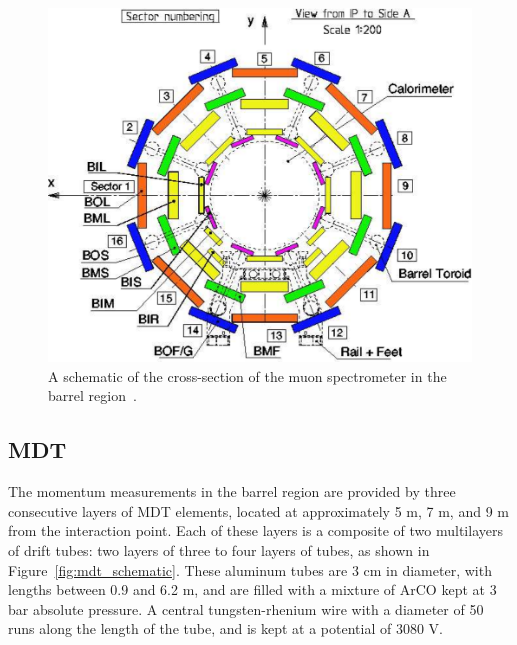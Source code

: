 \begin{figure}[hbtp]
\includegraphics[width=\fullfig]{figures/muon_barrel_schematic.pdf}
\caption{A schematic of the cross-section of the muon spectrometer in the barrel region~\cite{atlas_experiment}.}
\label{fig:muon_barrel_schematic}
\end{figure}


\subsection{\acl{MDT}}
\label{sec:mdt}
The momentum measurements in the barrel region are provided by three consecutive layers of \ac{MDT} elements, located at approximately 5 m, 7 m, and 9 m from the interaction point.
Each of these layers is a composite of two multilayers of drift tubes: two layers of three to four layers of tubes, as shown in Figure~\ref{fig:mdt_schematic}.
These aluminum tubes are 3 cm in diameter, with lengths between 0.9 and 6.2 m, and are filled with a mixture of ArCO kept at 3 bar absolute pressure.
A central tungsten-rhenium wire with a diameter of 50 \um runs along the length of the tube, and is kept at a potential of 3080 V.

